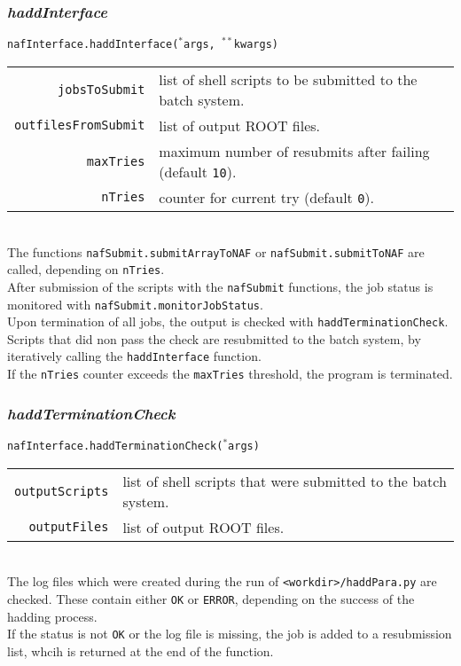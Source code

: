 \documentclass[12pt, a4paper]{article}
\newcommand{\args}{$^*$args}
\newcommand{\kwargs}{$^{**}$kwargs}
\begin{document}
\subsubsection{\textit{haddInterface}}
\texttt{nafInterface.haddInterface(\args, \kwargs)}\\
\begin{tabular}{r|l}
\hline
\texttt{jobsToSubmit}		&	list of shell scripts to be submitted to the batch system.\\
\texttt{outfilesFromSubmit}	&	list of output ROOT files.\\
\texttt{maxTries}			&	maximum number of resubmits after failing (default \texttt{10}).\\
\texttt{nTries}				&	counter for current try (default \texttt{0}).\\
\hline
\end{tabular}
\\
The functions \texttt{nafSubmit.submitArrayToNAF} or \texttt{nafSubmit.submitToNAF} are called, depending on \texttt{nTries}.\\
After submission of the scripts with the \texttt{nafSubmit} functions, the job status is monitored with \texttt{nafSubmit.monitorJobStatus}.\\
Upon termination of all jobs, the output is checked with \texttt{haddTerminationCheck}. Scripts that did non pass the check are resubmitted to the batch system, by iteratively calling the \texttt{haddInterface} function.\\
If the \texttt{nTries} counter exceeds the \texttt{maxTries} threshold, the program is terminated.\\

\subsubsection{\textit{haddTerminationCheck}}
\texttt{nafInterface.haddTerminationCheck(\args)}\\
\begin{tabular}{r|l}
\hline
\texttt{outputScripts}		&	list of shell scripts that were submitted to the batch system.	\\
\texttt{outputFiles}		&	list of output ROOT files.	\\
\hline
\end{tabular}
\\
The log files which were created during the run of \texttt{<workdir>/haddPara.py} are checked. These contain either \texttt{OK} or \texttt{ERROR}, depending on the success of the hadding process.\\
If the status is not \texttt{OK} or the log file is missing, the job is added to a resubmission list, whcih is returned at the end of the function.
\end{document}
